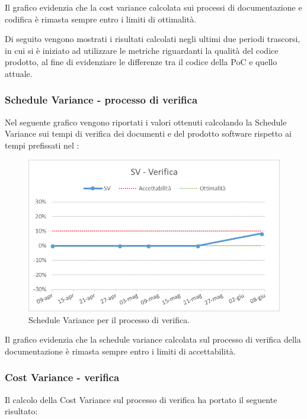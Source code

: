 Il grafico evidenzia che la cost variance calcolata sui processi di documentazione e codifica è rimasta sempre entro i limiti di ottimalità.

\newpage
Di seguito vengono mostrati i risultati calcolati negli ultimi due periodi trascorsi, in cui si è iniziato ad utilizzare le metriche riguardanti la qualità del codice prodotto, al fine di evidenziare le differenze tra il codice della PoC e quello attuale.

\subsubsection{Schedule Variance - processo di verifica}
Nel seguente grafico vengono riportati i valori ottenuti calcolando la Schedule Variance sui tempi di verifica dei documenti e del prodotto software rispetto ai tempi prefissati nel \PdP{}:

\begin{figure}[h!]
	\centering
	\includegraphics[scale=0.75]{img/Grafici/SV-Verifica.png}
	\caption{Schedule Variance per il processo di verifica.}
	\label{fig:SV-VerDocumenti}
\end{figure}

Il grafico evidenzia che la schedule variance calcolata sul processo di verifica della documentazione è rimasta sempre entro i limiti di accettabilità.


\subsubsection{Cost Variance - verifica}
Il calcolo della Cost Variance sul processo di verifica ha portato il seguente risultato: 


